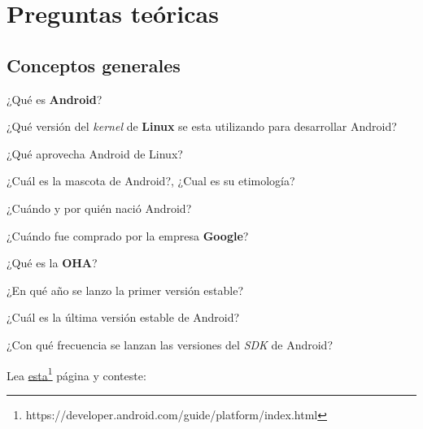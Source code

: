 \section{Preguntas teóricas}

\subsection{Conceptos generales}
\begin{questions}
  \question ¿Qué es \textbf{Android}?
  
  \question ¿Qué versión del \textit{kernel} de \textbf{Linux} se esta utilizando para desarrollar Android?

  \question ¿Qué aprovecha Android de Linux?

  \question ¿Cuál es la mascota de Android?, ¿Cual es su etimología?
  
  \question ¿Cuándo y por quién nació Android?
  
  \question ¿Cuándo fue comprado por la empresa \textbf{Google}?
  
  \question ¿Qué es la \textbf{OHA}?
  
  \question ¿En qué año se lanzo la primer versión estable?
  
  \question ¿Cuál es la última versión estable de Android?
  
  \question ¿Con qué frecuencia se lanzan las versiones del \textit{SDK} de Android?
  
  \question Lea \href{https://developer.android.com/guide/platform/index.html}{esta}\footnote{https://developer.android.com/guide/platform/index.html} página y conteste:
\end{questions}
